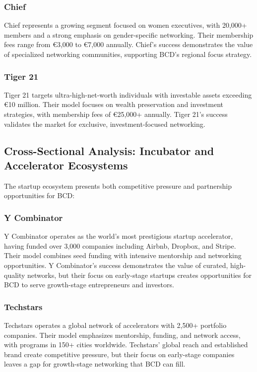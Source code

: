 \subsubsection{Chief}
Chief represents a growing segment focused on women executives, with 20,000+ members and a strong emphasis on gender-specific networking. Their membership fees range from €3,000 to €7,000 annually. Chief's success demonstrates the value of specialized networking communities, supporting BCD's regional focus strategy.

\subsubsection{Tiger 21}
Tiger 21 targets ultra-high-net-worth individuals with investable assets exceeding €10 million. Their model focuses on wealth preservation and investment strategies, with membership fees of €25,000+ annually. Tiger 21's success validates the market for exclusive, investment-focused networking.

\subsection{Cross-Sectional Analysis: Incubator and Accelerator Ecosystems}

The startup ecosystem presents both competitive pressure and partnership opportunities for BCD:

\subsubsection{Y Combinator}
Y Combinator operates as the world's most prestigious startup accelerator, having funded over 3,000 companies including Airbnb, Dropbox, and Stripe. Their model combines seed funding with intensive mentorship and networking opportunities. Y Combinator's success demonstrates the value of curated, high-quality networks, but their focus on early-stage startups creates opportunities for BCD to serve growth-stage entrepreneurs and investors.

\subsubsection{Techstars}
Techstars operates a global network of accelerators with 2,500+ portfolio companies. Their model emphasizes mentorship, funding, and network access, with programs in 150+ cities worldwide. Techstars' global reach and established brand create competitive pressure, but their focus on early-stage companies leaves a gap for growth-stage networking that BCD can fill.

